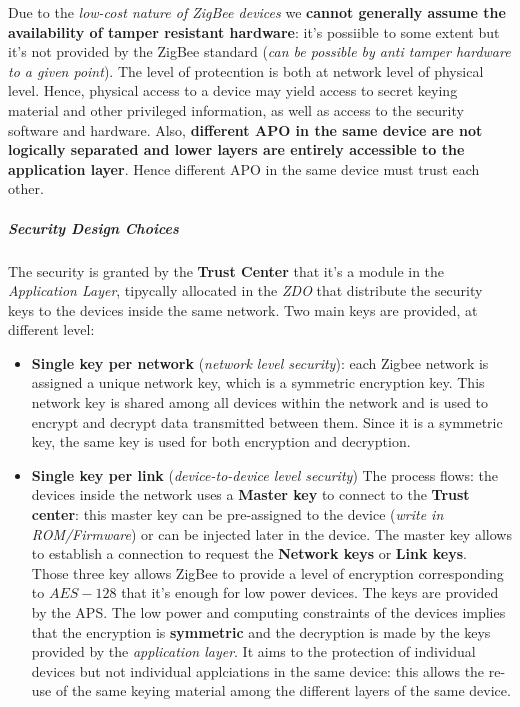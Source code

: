 \documentclass[10pt,a4paper]{report}
\theoremstyle{definition}
\begin{document}
Due to the \textit{low-cost nature of ZigBee devices} we \textbf{cannot generally assume the availability of tamper resistant hardware}: it's possiible to some extent but it's not provided by the ZigBee standard (\textit{can be possible by anti tamper hardware to a given point}).  The level of protecntion is both at network level of physical level.  Hence, physical access to a device may yield access to secret keying material and other privileged information, as well as access to the security software and hardware. Also, \textbf{different APO in the same device are not logically separated and lower layers are entirely accessible to the application layer}. Hence different APO in the same device must trust each other.
\subparagraph{Security Design Choices}\label{sec:security-design-choices}
The security is granted by the \textbf{Trust Center} that it's a module in the \textit{Application Layer}, tipycally allocated in the \textit{ZDO} that distribute the security keys to the devices inside the same network.
Two main keys are provided, at different level:
\begin{itemize}
	\item 
	\textbf{Single key per network} (\textit{network level security}): each Zigbee network is assigned a unique network key, which is a symmetric encryption key. This network key is shared among all devices within the network and is used to encrypt and decrypt data transmitted between them. Since it is a symmetric key, the same key is used for both encryption and decryption.
	\item 
	\textbf{Single key per link} (\textit{device-to-device level security})
	The process flows: the devices inside the network uses a \textbf{Master key} to connect to the \textbf{Trust center}: this master key can be pre-assigned to the device (\textit{write in ROM/Firmware}) or can be injected later in the device. The master key allows to establish a connection to request  the \textbf{Network keys} or \textbf{Link keys}. \\ 
	Those three key allows ZigBee to provide a level of encryption corresponding to $AES-128$ that it's enough for low power devices. The keys are provided by the APS. The low power and computing constraints of the devices implies that the encryption is \textbf{symmetric} and the decryption is made by the keys provided by the \textit{application layer}.
	It aims to the protection of individual devices but not individual applciations in the same device: this allows the re-use of the same keying material among the different layers of the same device.
\end{itemize}
\end{document}
